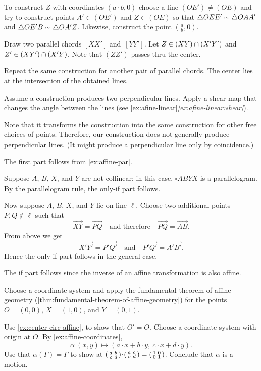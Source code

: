To construct $Z$ with coordinates $(a\cdot b,0)$
choose a line $(OE')\ne (OE)$
and try to construct points $A'\in (OE')$
and $Z \in(OE)$
so that 
$\triangle OEE'\sim \triangle OAA'$ and $\triangle OE'B\sim \triangle OA'Z$.
Likewise, construct the point $(\tfrac ab,0)$.

Draw two parallel chords $[XX']$ and~$[YY']$.
Let $Z\in(XY)\cap (X'Y')$ and $Z'\in (XY')\cap (X'Y)$.
Note that $(ZZ')$ passes thru the center.

Repeat the same construction for another pair of parallel chords.
The center lies at the intersection of the obtained lines.

Assume a construction produces two perpendicular lines.
Apply a shear map that changes the angle between the lines (see \ref{ex:afine-linear}\textit{\ref{ex:afine-linear:shear}}).

Note that it transforms the construction into the same construction for other free choices of points.
Therefore, our construction does not generally produce perpendicular lines.
(It might produce a perpendicular line only by coincidence.)
 
The first part follows from \ref{ex:affine-par}.

Suppose $A$, $B$, $X$, and $Y$ are not collinear;
in this case, $\square ABYX$ is a parallelogram.
By the parallelogram rule, the only-if part follows.

Now suppose $A$, $B$, $X$, and $Y$ lie on line $\ell$.
Choose two additional points $P,Q\notin\ell$ such that 
\[\overrightarrow{XY}=\overrightarrow{PQ}
\quad\text{and therefore}\quad 
\overrightarrow{PQ}=\overrightarrow{AB}.\]
From above we get 
\[\overrightarrow{X'Y'}=\overrightarrow{P'Q'}
\quad\text{and}\quad 
\overrightarrow{P'Q'}=\overrightarrow{A'B'}.\]
Hence the only-if part follows in the general case.

The if part follows since the inverse of an affine transformation is also affine.
 
Choose a coordinate system and apply the fundamental theorem of affine geometry (\ref{thm:fundamental-theorem-of-affine-geometry}) for the points $O=(0,0)$, $X=(1,0)$, and $Y=(0,1)$.

Use \ref{ex:center-circ-affine}, to show that $O'=O$.
Choose a coordinate system with origin at $O$.
By \ref{ex:affine-coordinates}, 
\[\alpha\:(x,y)\mapsto(a\cdot x+b\cdot y,\ c\cdot x+d\cdot y).\]
Use that $\alpha(\Gamma)=\Gamma$ to show at $(\begin{smallmatrix}a&b\\c&d\end{smallmatrix})\cdot (\begin{smallmatrix}a&c\\b&d\end{smallmatrix})\z=(\begin{smallmatrix}1&0\\0&1\end{smallmatrix})$.
Conclude that $\alpha$ is a motion.

